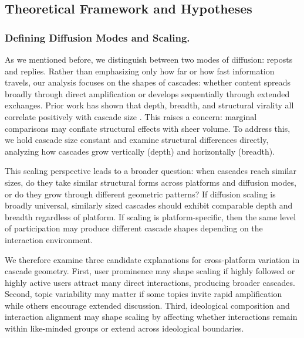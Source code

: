 \documentclass[letterpaper]{article} %
\begin{document}

\subsection{Theoretical Framework and Hypotheses}

\subsubsection{Defining Diffusion Modes and Scaling.}
As we mentioned before, we distinguish between two modes of diffusion: reposts and replies. Rather than emphasizing only how far or how fast information travels, our analysis focuses on the shapes of cascades: whether content spreads broadly through direct amplification or develops sequentially through extended exchanges. Prior work has shown that depth, breadth, and structural virality all correlate positively with cascade size \cite{juul_comparing_2021}. This raises a concern: marginal comparisons may conflate structural effects with sheer volume. To address this, we hold cascade size constant and examine structural differences directly, analyzing how cascades grow vertically (depth) and horizontally (breadth).


This scaling perspective leads to a broader question: when cascades reach similar sizes, do they take similar structural forms across platforms and diffusion modes, or do they grow through different geometric patterns? If diffusion scaling is broadly universal, similarly sized cascades should exhibit comparable depth and breadth regardless of platform. If scaling is platform-specific, then the same level of participation may produce different cascade shapes depending on the interaction environment.

We therefore examine three candidate explanations for cross-platform variation in cascade geometry. First, user prominence may shape scaling if highly followed or highly active users attract many direct interactions, producing broader cascades. Second, topic variability may matter if some topics invite rapid amplification while others encourage extended discussion. Third, ideological composition and interaction alignment may shape scaling by affecting whether interactions remain within like-minded groups or extend across ideological boundaries. 
\end{document}
